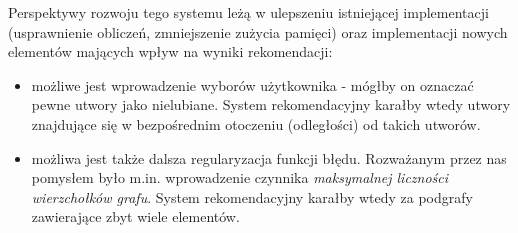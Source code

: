 \documentclass[a4paper,10pt]{article}
\begin{document}
Perspektywy rozwoju tego systemu leżą w ulepszeniu istniejącej implementacji (usprawnienie obliczeń, zmniejszenie zużycia pamięci) oraz implementacji nowych elementów mających wpływ na wyniki rekomendacji:

\begin{itemize}
  \item możliwe jest wprowadzenie wyborów użytkownika - mógłby on oznaczać pewne utwory jako nielubiane. System rekomendacyjny karałby wtedy utwory znajdujące się w bezpośrednim otoczeniu (odległości) od takich utworów.
  \item możliwa jest także dalsza regularyzacja funkcji błędu. Rozważanym przez nas pomysłem było m.in. wprowadzenie czynnika \textit{maksymalnej liczności wierzchołków grafu}. System rekomendacyjny karałby wtedy za podgrafy zawierające zbyt wiele elementów.
\end{itemize}
\end{document}
